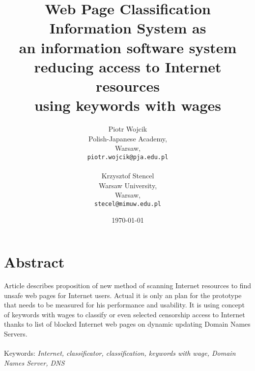 \documentclass[9pt,a4paper]{extarticle}
\title{Web Page Classification Information System  as\\ an information software system\\ reducing access to Internet resources\\ using keywords with wages}
\author{Piotr Wojcik\\
    Polish-Japanese Academy,\\
    Warsaw,\\
    \texttt{piotr.wojcik@pja.edu.pl}\\
\\
    Krzysztof Stencel\\
    Warsaw University,\\
    Warsaw,\\
    \texttt{stecel@mimuw.edu.pl}}
\date{\today}
\begin{document}
\maketitle



\section{Abstract}
Article describes proposition of new method of scanning Internet resources to find unsafe web pages for Internet users. Actual it is only an plan for the prototype that needs to be measured for his performance and usability. It is using concept of keywords with wages to classify or even selected censorship access to Internet thanks to list of blocked Internet web pages on dynamic updating Domain Names Servers.\\
\\
Keywords: \textit{Internet, classificator, classification, keywords with wage, Domain Names Server, DNS}
\end{document}
